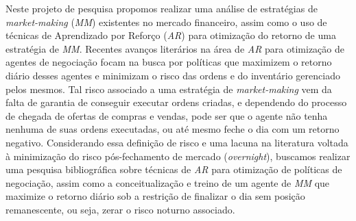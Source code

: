 Neste projeto de pesquisa propomos realizar uma análise de estratégias de \textit{market-making} (\textit{MM}) existentes no mercado financeiro, assim como o uso de técnicas de Aprendizado por Reforço (\textit{AR}) para otimização do retorno de uma estratégia de \textit{MM}. Recentes avanços literários na área de \textit{AR} para otimização de agentes de negociação focam na busca por políticas que maximizem o retorno diário desses agentes e minimizam o risco das ordens e do inventário gerenciado pelos mesmos. Tal risco associado a uma estratégia de \textit{market-making} vem da falta de garantia de conseguir executar ordens criadas, e dependendo do processo de chegada de ofertas de compras e vendas, pode ser que o agente não tenha nenhuma de suas ordens executadas, ou até mesmo feche o dia com um retorno negativo. Considerando essa definição de risco e uma lacuna na literatura voltada à minimização do risco pós-fechamento de mercado (\textit{overnight}), buscamos realizar uma pesquisa bibliográfica sobre técnicas de \textit{AR} para otimização de políticas de negociação, assim como a conceitualização e treino de um agente de \textit{MM} que maximize o retorno diário sob a restrição de finalizar o dia sem posição remanescente, ou seja, zerar o risco noturno associado. 

